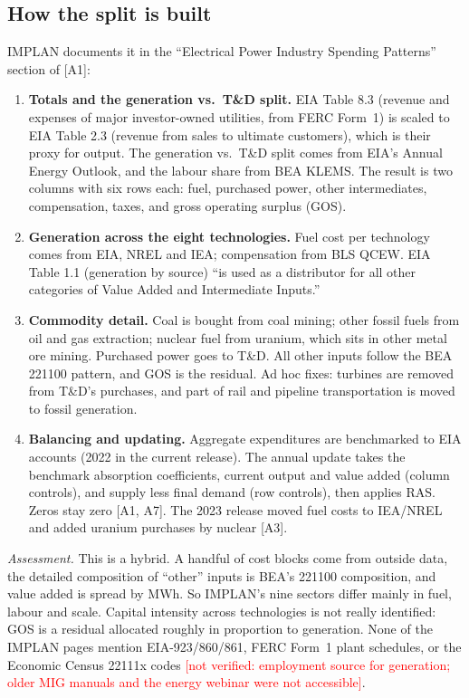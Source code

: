 \documentclass[11pt]{article}
\newcommand{\todo}[1]{\textcolor{red}{[#1]}}
\begin{document}
\subsection{How the split is built}
IMPLAN documents it in the ``Electrical Power Industry Spending Patterns'' section of [A1]:
\begin{enumerate}
  \item \textbf{Totals and the generation vs.\ T\&D split.} EIA Table 8.3 (revenue and expenses of major investor-owned utilities, from FERC Form~1) is scaled to EIA Table 2.3 (revenue from sales to ultimate customers), which is their proxy for output. The generation vs.\ T\&D split comes from EIA's Annual Energy Outlook, and the labour share from BEA KLEMS. The result is two columns with six rows each: fuel, purchased power, other intermediates, compensation, taxes, and gross operating surplus (GOS).
  \item \textbf{Generation across the eight technologies.} Fuel cost per technology comes from EIA, NREL and IEA; compensation from BLS QCEW. EIA Table 1.1 (generation by source) ``is used as a distributor for all other categories of Value Added and Intermediate Inputs.''
  \item \textbf{Commodity detail.} Coal is bought from coal mining; other fossil fuels from oil and gas extraction; nuclear fuel from uranium, which sits in other metal ore mining. Purchased power goes to T\&D. All other inputs follow the BEA 221100 pattern, and GOS is the residual. Ad hoc fixes: turbines are removed from T\&D's purchases, and part of rail and pipeline transportation is moved to fossil generation.
  \item \textbf{Balancing and updating.} Aggregate expenditures are benchmarked to EIA accounts (2022 in the current release). The annual update takes the benchmark absorption coefficients, current output and value added (column controls), and supply less final demand (row controls), then applies RAS. Zeros stay zero [A1, A7]. The 2023 release moved fuel costs to IEA/NREL and added uranium purchases by nuclear [A3].
\end{enumerate}
\emph{Assessment.} This is a hybrid. A handful of cost blocks come from outside data, the detailed composition of ``other'' inputs is BEA's 221100 composition, and value added is spread by MWh. So IMPLAN's nine sectors differ mainly in fuel, labour and scale. Capital intensity across technologies is not really identified: GOS is a residual allocated roughly in proportion to generation. None of the IMPLAN pages mention EIA-923/860/861, FERC Form~1 plant schedules, or the Economic Census 22111x codes \todo{not verified: employment source for generation; older MIG manuals and the energy webinar were not accessible}.
\end{document}
